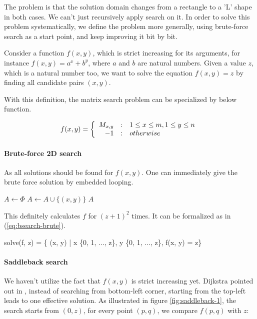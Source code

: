\documentclass[UTF8]{article}
\begin{document}
The problem is that the solution domain changes from a rectangle to a 'L' shape in both cases. We can't just
recursively apply search on it. In order to solve this problem systematically, we define the problem more
generally, using brute-force search as a start point, and keep improving it bit by bit.

Consider a function $f(x, y)$, which is strict increasing for its arguments, for instance $f(x, y) = a^x + b^y$, where
$a$ and $b$ are natural numbers. Given a value $z$, which is a natural number too, we want to solve the equation
$f(x, y) = z$ by finding all candidate pairs $(x, y)$.

With this definition, the matrix search problem can be specialized by below function.

\[
f(x, y) = \left \{
  \begin{array}
  {r@{\quad:\quad}l}
  M_{x, y} & 1 \leq x \leq m, 1 \leq y \leq n \\
  -1 & otherwise
  \end{array}
\right.
\]

\paragraph{Brute-force 2D search}

As all solutions should be found for $f(x, y)$. One can immediately give the
brute force solution by embedded looping.

\begin{algorithmic}[1]
  \State $A \gets \Phi$
        \State $A \gets A \cup \{(x, y)\}$
      \EndIf
    \EndFor
  \EndFor
  \State \Return $A$
\EndFunction
\end{algorithmic}

This definitely calculates $f$ for $(z+1)^2$ times. It can be formalized as in (\ref{eq:bsearch-brute}).

\be
solve(f, z) = \{ (x, y) | x \in \{0, 1, ..., z\}, y \in \{0, 1, ..., z\}, f(x, y) = z\}
\label{eq:bsearch-brute}
\ee

\paragraph{Saddleback search}

We haven't utilize the fact that $f(x, y)$ is strict increasing yet. Dijkstra pointed out in \cite{saddle-back}, instead
of searching from bottom-left corner, starting from the top-left leads to one effective solution. As illustrated in figure
\ref{fig:saddleback-1}, the search starts from $(0, z)$, for every point $(p, q)$, we compare $f(p, q)$ with $z$:
\end{document}
